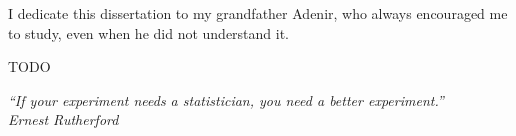 \newpage

\begin{dedicatoria}
    \vspace*{\fill}
    \hfill
    \begin{minipage}{.6\textwidth}
        I dedicate this dissertation to my grandfather	Adenir, who always encouraged me to study, even
        when he did not understand it.
    \end{minipage}
\end{dedicatoria}
 
\begin{agradecimentos}
	TODO 
\end{agradecimentos}

\begin{epigrafe}
\vspace*{\fill}

\begin{flushright}
    \hspace{7.5cm}
    \textit{
        ``If your experiment needs a statistician, you need a better
        experiment.''} \\
        \textit{Ernest Rutherford}
\end{flushright}
\end{epigrafe}
